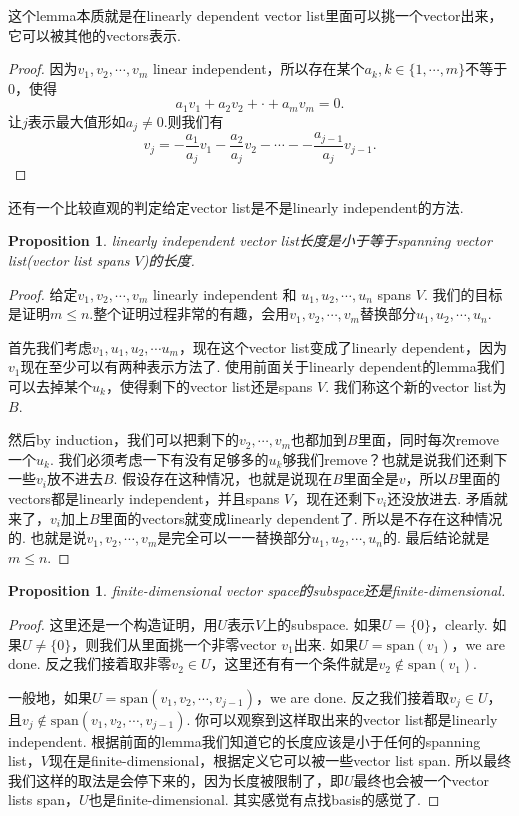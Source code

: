\documentclass{article}
\newtheorem{proposition}[theorem]{Proposition}
\begin{document}
{\color{blue} 这个lemma本质就是在linearly dependent vector list里面可以挑一个vector出来，它可以被其他的vectors表示}.

\begin{proof}
因为$v_1,v_2,\cdots,v_m$ linear independent，所以存在某个$a_k,k \in \{1,\cdots,m\}$不等于$0$，使得
$$
a_1v_1+a_2v_2+\cdot+a_mv_m=0.
$$
让$j$表示最大值形如$a_j \neq 0.$则我们有
$$
v_j = -\frac{a_1}{a_j}v_1-\frac{a_2}{a_j}v_2-\cdots--\frac{a_{j-1}}{a_j}v_{j-1}.
$$ 
\end{proof}

还有一个比较直观的判定给定vector list是不是linearly independent的方法.

\begin{proposition}
\rm linearly independent vector list长度是小于等于spanning vector list(vector list spans $V$)的长度.
\end{proposition}

\begin{proof}
给定$v_1,v_2,\cdots,v_m$ linearly independent 和 $u_1,u_2,\cdots,u_n$ spans $V$. 我们的目标是证明$m \leq n.$整个证明过程非常的有趣，会用$v_1,v_2,\cdots,v_m$替换部分$u_1,u_2,\cdots,u_n.$

首先我们考虑$v_1, u_1,u_2,\cdots u_m$，现在这个vector list变成了linearly dependent，因为$v_1$现在至少可以有两种表示方法了. 使用前面关于linearly dependent的lemma我们可以去掉某个$u_k$，使得剩下的vector list还是spans $V$. 我们称这个新的vector list为$B$.

然后by induction，我们可以把剩下的$v_2,\cdots,v_m$也都加到$B$里面，同时每次remove一个$u_k$. 我们必须考虑一下有没有足够多的$u_k$够我们remove？也就是说我们还剩下一些$v_i$放不进去$B$. 假设存在这种情况，也就是说现在$B$里面全是$v$，所以$B$里面的vectors都是linearly independent，并且spans $V$，现在还剩下$v_i$还没放进去. 矛盾就来了，$v_i$加上$B$里面的vectors就变成linearly dependent了. 所以是不存在这种情况的. 也就是说$v_1,v_2,\cdots,v_m$是完全可以一一替换部分$u_1,u_2,\cdots,u_n$的. 最后结论就是$m \leq n.$
\end{proof}


\begin{proposition}
\rm finite-dimensional vector space的subspace还是finite-dimensional.
\end{proposition}

\begin{proof}
这里还是一个构造证明，用$U$表示$V$上的subspace. 如果$U = \{0\}$，clearly. 如果$U \neq \{0\}$，则我们从里面挑一个非零vector $v_1$出来.  如果$U = \text{span}(v_1)$，we are done. 反之我们接着取非零$v_2 \in U$，这里还有有一个条件就是$v_2 \notin \text{span}(v_1).$   

一般地，如果$U = \text{span}(v_1,v_2,\cdots,v_{j-1})$，we are done. 反之我们接着取$v_j \in U$，且$v_j \notin \text{span}(v_1,v_2,\cdots,v_{j-1})$. 你可以观察到这样取出来的vector list都是linearly independent. 根据前面的lemma我们知道它的长度应该是小于任何的spanning list，$V$现在是finite-dimensional，根据定义它可以被一些vector list span. 所以最终我们这样的取法是会停下来的，因为长度被限制了，即$U$最终也会被一个vector lists span，$U$也是finite-dimensional. {\color{red} 其实感觉有点找basis的感觉了.} 
\end{proof}
\end{document}
